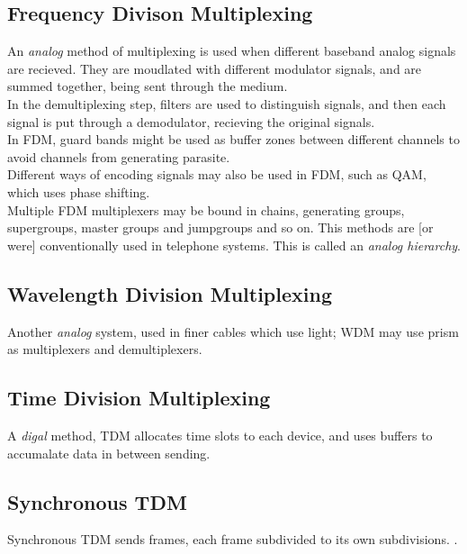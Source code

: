 \documentclass[11pt,a4paper,twoside]{book}
\begin{document}
\subsection{Frequency Divison Multiplexing}

An \textit{analog} method of multiplexing is used when different baseband analog signals are recieved. They are moudlated with different modulator signals, and are summed together, being sent through the medium.\\

In the demultiplexing step, filters are used to distinguish signals, and then each signal is put through a demodulator, recieving the original signals.\\

In FDM, guard bands might be used as buffer zones between different channels to avoid channels from generating parasite.\\

Different ways of encoding signals may also be used in FDM, such as QAM, which uses phase shifting.\\

Multiple FDM multiplexers may be bound in chains, generating groups, supergroups, master groups and jumpgroups and so on. This methods are [or were] conventionally used in telephone systems. This is called an \textit{analog hierarchy}.

\subsection{Wavelength Division Multiplexing}

Another \textit{analog} system, used in finer cables which use light; WDM may use prism as multiplexers and demultiplexers.

\subsection{Time Division Multiplexing}

A \textit{digal} method, TDM allocates time slots to each device, and uses buffers to accumalate data in between sending.

\subsection{Synchronous TDM}

Synchronous TDM sends frames, each frame subdivided to its own subdivisions. \unsure.
\end{document}
